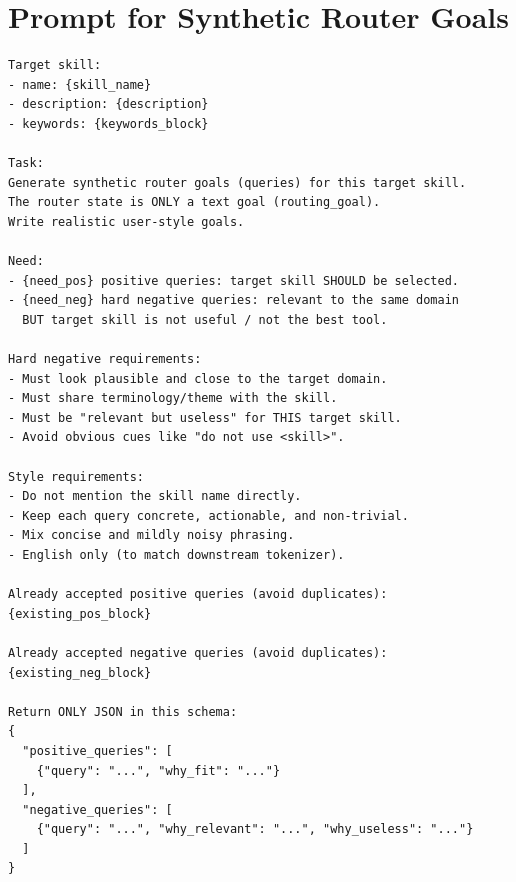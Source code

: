 \documentclass[11pt,a4paper]{article}
\begin{document}
\section{Prompt for Synthetic Router Goals}\label{app:router_prompt}
\begin{center}
\begin{minipage}{0.95\linewidth}
\begin{tcolorbox}[title={Prompt for synthetic router goals},breakable,colback=white,colframe=black!60,boxrule=0.6pt,arc=2pt,left=6pt,right=6pt,top=6pt,bottom=6pt]
\begin{verbatim}
Target skill:
- name: {skill_name}
- description: {description}
- keywords: {keywords_block}

Task:
Generate synthetic router goals (queries) for this target skill.
The router state is ONLY a text goal (routing_goal).
Write realistic user-style goals.

Need:
- {need_pos} positive queries: target skill SHOULD be selected.
- {need_neg} hard negative queries: relevant to the same domain
  BUT target skill is not useful / not the best tool.

Hard negative requirements:
- Must look plausible and close to the target domain.
- Must share terminology/theme with the skill.
- Must be "relevant but useless" for THIS target skill.
- Avoid obvious cues like "do not use <skill>".

Style requirements:
- Do not mention the skill name directly.
- Keep each query concrete, actionable, and non-trivial.
- Mix concise and mildly noisy phrasing.
- English only (to match downstream tokenizer).

Already accepted positive queries (avoid duplicates):
{existing_pos_block}

Already accepted negative queries (avoid duplicates):
{existing_neg_block}

Return ONLY JSON in this schema:
{
  "positive_queries": [
    {"query": "...", "why_fit": "..."}
  ],
  "negative_queries": [
    {"query": "...", "why_relevant": "...", "why_useless": "..."}
  ]
}
\end{verbatim}
\end{tcolorbox}
\end{minipage}
\end{center}
\end{document}
